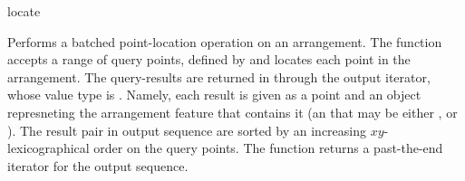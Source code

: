 
\ccRefPageBegin

\begin{ccRefFunction}{locate}


   {Performs a batched point-location operation on an arrangement.
    The function accepts a range of query points, defined by
    \ccc{[points_begin, points_end)} and locates each point in the
    arrangement. The query-results are returned in through the output iterator,
    whose value type is . Namely, each
    result is given as a point and an object represneting the arrangement
    feature that contains it (an  that may be either
    ,  or
    ). The result pair in output sequence are sorted
    by an increasing $xy$-lexicographical order on the query points.
    The function returns a past-the-end iterator for the output sequence.
    }

\end{ccRefFunction}

\ccRefPageEnd
